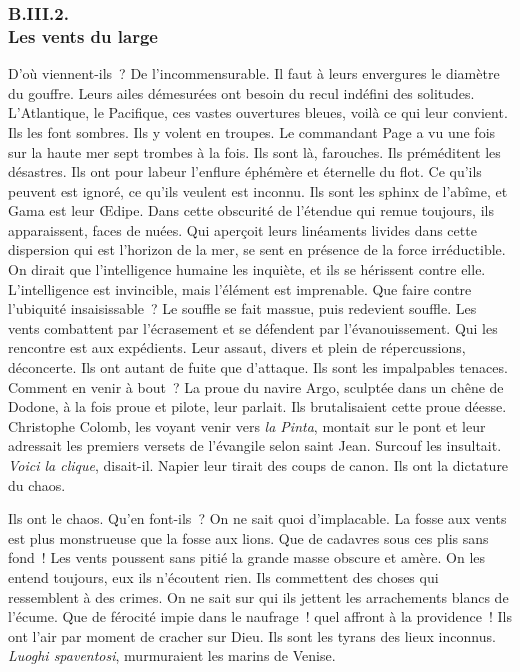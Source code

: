 \documentclass[french,twoside]{book} %
\begin{document}
 \subsubsection[{B.III.2. Les vents du large}]{B.III.2. \\
Les vents du large}
\noindent D’où viennent-ils ? De l’incommensurable. Il faut à leurs envergures le diamètre du gouffre. Leurs ailes démesurées ont besoin du recul indéfini des solitudes. L’Atlantique, le Pacifique, ces vastes ouvertures bleues, voilà ce qui leur convient. Ils les font sombres. Ils y volent en troupes. Le commandant Page a vu une fois sur la haute mer sept trombes à la fois. Ils sont là, farouches. Ils préméditent les désastres. Ils ont pour labeur l’enflure éphémère et éternelle du flot. Ce qu’ils peuvent est ignoré, ce qu’ils veulent est inconnu. Ils sont les sphinx de l’abîme, et Gama est leur Œdipe. Dans cette obscurité de l’étendue qui remue toujours, ils apparaissent, faces de nuées. Qui aperçoit leurs linéaments livides dans cette dispersion qui est l’horizon de la mer, se sent en présence de la force irréductible. On dirait que l’intelligence humaine les inquiète, et ils se hérissent contre elle. L’intelligence est invincible, mais l’élément est imprenable. Que faire contre  l’ubiquité insaisissable ? Le souffle se fait massue, puis redevient souffle. Les vents combattent par l’écrasement et se défendent par l’évanouissement. Qui les rencontre est aux expédients. Leur assaut, divers et plein de répercussions, déconcerte. Ils ont autant de fuite que d’attaque. Ils sont les impalpables tenaces. Comment en venir à bout ? La proue du navire Argo, sculptée dans un chêne de Dodone, à la fois proue et pilote, leur parlait. Ils brutalisaient cette proue déesse. Christophe Colomb, les voyant venir vers \emph{la Pinta}, montait sur le pont et leur adressait les premiers versets de l’évangile selon saint Jean. Surcouf les insultait. \emph{Voici la clique}, disait-il. Napier leur tirait des coups de canon. Ils ont la dictature du chaos.\par
Ils ont le chaos. Qu’en font-ils ? On ne sait quoi d’implacable. La fosse aux vents est plus monstrueuse que la fosse aux lions. Que de cadavres sous ces plis sans fond ! Les vents poussent sans pitié la grande masse obscure et amère. On les entend toujours, eux ils n’écoutent rien. Ils commettent des choses qui ressemblent à des crimes. On ne sait sur qui ils jettent les arrachements blancs de l’écume. Que de férocité impie dans le naufrage ! quel affront à la providence ! Ils ont l’air par moment de cracher sur Dieu. Ils sont les tyrans des lieux inconnus. \emph{Luoghi spaventosi}, murmuraient les marins de Venise.\par
\end{document}
